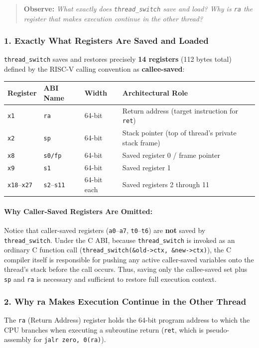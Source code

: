 \documentclass{labreport}
\begin{document}
\begin{quote}
\textbf{Observe:} \textit{What exactly does \texttt{thread\_switch} save and load? Why is \texttt{ra} the register that makes execution continue in the other thread?}
\end{quote}

\subsubsection{1. Exactly What Registers Are Saved and Loaded}
\texttt{thread\_switch} saves and restores precisely \textbf{14 registers} (112 bytes total) defined by the RISC-V calling convention as \textbf{callee-saved}:
\begin{center}
\begin{tabularx}{\textwidth}{l l l X}
\toprule
\textbf{Register} & \textbf{ABI Name} & \textbf{Width} & \textbf{Architectural Role} \\
\midrule
\texttt{x1}  & \texttt{ra}     & 64-bit & Return address (target instruction for \texttt{ret}) \\
\texttt{x2}  & \texttt{sp}     & 64-bit & Stack pointer (top of thread's private stack frame) \\
\texttt{x8}  & \texttt{s0/fp}  & 64-bit & Saved register 0 / frame pointer \\
\texttt{x9}  & \texttt{s1}     & 64-bit & Saved register 1 \\
\texttt{x18}--\texttt{x27} & \texttt{s2}--\texttt{s11} & 64-bit each & Saved registers 2 through 11 \\
\bottomrule
\end{tabularx}
\end{center}

\paragraph{Why Caller-Saved Registers Are Omitted:}
Notice that caller-saved registers (\texttt{a0}--\texttt{a7}, \texttt{t0}--\texttt{t6}) are \textbf{not} saved by \texttt{thread\_switch}. Under the C ABI, because \texttt{thread\_switch} is invoked as an ordinary C function call (\texttt{thread\_switch(\&old->ctx, \&new->ctx)}), the C compiler itself is responsible for pushing any active caller-saved variables onto the thread's stack before the call occurs. Thus, saving only the callee-saved set plus \texttt{sp} and \texttt{ra} is necessary and sufficient to restore full execution context.

\subsubsection{2. Why ra Makes Execution Continue in the Other Thread}
The \texttt{ra} (Return Address) register holds the 64-bit program address to which the CPU branches when executing a subroutine return (\texttt{ret}, which is pseudo-assembly for \texttt{jalr zero, 0(ra)}).
\end{document}
